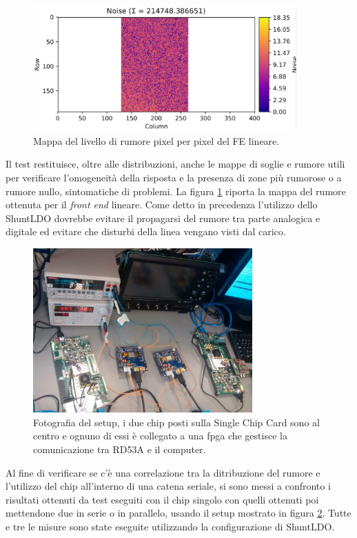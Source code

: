 \begin{figure}
\centering
\includegraphics[width=0.9\textwidth]{Immagini/NoiseMap}
\caption{Mappa del livello di rumore pixel per pixel del FE lineare.}
\label{NoiseMap}
\end{figure}
Il test restituisce, oltre alle distribuzioni, anche le mappe di soglie e rumore utili per verificare l'omogeneità della risposta e la presenza di zone più rumorose o a rumore nullo, sintomatiche di problemi.
La figura \ref{NoiseMap} riporta la mappa del rumore ottenuta per il \textit{front end} lineare. 
Come detto in precedenza l'utilizzo dello ShuntLDO dovrebbe evitare il propagarsi del rumore tra parte analogica e digitale ed evitare che disturbi della linea vengano visti dal carico. 
\begin{figure}
\centering
\includegraphics[width=0.75\textwidth]{Immagini/chipserial}
\caption{Fotografia del setup, i due chip posti sulla Single Chip Card sono al centro e ognuno di essi è collegato a una fpga che gestisce la comunicazione tra RD53A e il computer.}
\label{chipserial}
\end{figure}
Al fine di verificare se c'è una correlazione tra la ditribuzione del rumore e l'utilizzo del chip all'interno di una catena seriale, si sono messi a confronto i risultati ottenuti da test eseguiti con il chip singolo con quelli ottenuti poi mettendone due in serie o in parallelo, usando il setup mostrato in figura \ref{chipserial}.
Tutte e tre le misure sono state eseguite utilizzando la configurazione di ShuntLDO. 

